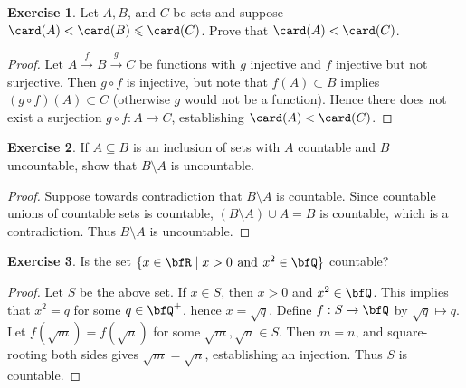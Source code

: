 \documentclass[10pt,twoside,openany]{memoir}
\theoremstyle{plain}
\theoremstyle{definition}
\newtheorem{exercise}{Exercise}
\theoremstyle{remark}
\numberwithin{equation}{section}
\renewcommand{\leq}{\leqslant}
\begin{document}
    \begin{exercise}
        Let $A,B$, and $C$ be sets and suppose $\card(A) < \card(B) \leq \card(C)$. Prove that $\card(A) < \card(C)$.
    \end{exercise}
        \begin{proof}
            Let $A \xrightarrow{f} B \xrightarrow{g} C$ be functions with $g$ injective and $f$ injective but not surjective. Then $g\circ f$ is injective, but note that $f(A) \subset B$ implies $(g\circ f)(A) \subset C$ (otherwise $g$ would not be a function). Hence there does not exist a surjection $g \circ f : A \rightarrow C$, establishing $\card(A) < \card(C)$.
        \end{proof}
    \begin{exercise}
        If $A \subseteq B$ is an inclusion of sets with $A$ countable and $B$ uncountable, show that $B\setminus A$ is uncountable.
    \end{exercise}
        \begin{proof}
            Suppose towards contradiction that $B\setminus A$ is countable. Since countable unions of countable sets is countable, $(B\setminus A) \cup A = B$ is countable, which is a contradiction. Thus $B\setminus A$ is uncountable.
        \end{proof}
    \begin{exercise}
        Is the set $\{x \in \bfR \mid x > 0 \hspace{4pt}\text{and}\hspace{4pt} x^2 \in \bfQ\}$ countable?
    \end{exercise}
        \begin{proof}
            Let $S$ be the above set. If $x \in S$, then $x>0$ and $x^2 \in \bfQ$. This implies that $x^2 = q$ for some $q \in \bfQ^+$, hence $x = \sqrt{q}$. Define $f:S \rightarrow \bfQ$ by $\sqrt{q} \mapsto q$. Let $f(\sqrt{m}) = f(\sqrt{n})$ for some $\sqrt{m},\sqrt{n} \in S$. Then $m = n$, and square-rooting both sides gives $\sqrt{m} = \sqrt{n}$, establishing an injection. Thus $S$ is countable.
        \end{proof}
\end{document}
